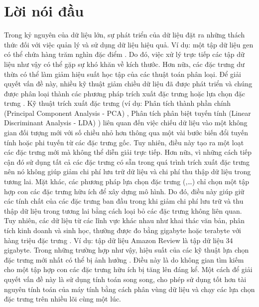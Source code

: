 \chapter*{Lời nói đầu}

Trong kỷ nguyên của dữ liệu lớn, sự phát triển của dữ liệu đặt ra những thách thức đối với việc quản lý và sử dụng dữ liệu hiệu quả. Ví dụ: một tập dữ liệu gen có thể chứa hàng trăm nghìn đặc điểm \cite{guyon2007competitive}. Do đó, việc xử lý trực tiếp các tập dữ liệu như vậy có thể gặp sự khó khăn về kích thước. Hơn nữa, các đặc trưng dư thừa có thể làm giảm hiệu suất học tập của các thuật toán phân loại. Để giải quyết vấn đề này, nhiều kỹ thuật giảm chiều dữ liệu đã được phát triển \cite{melab2006grid,de2006parallelizing,garcia2006parallel,guillen2009efficient,lopez2006solving} và chúng được phân loại thành các phương pháp trích xuất đặc trưng hoặc lựa chọn đặc trưng \cite{liu2012feature, kumar2014feature}. Kỹ thuật trích xuất đặc trưng (ví dụ: Phân tích thành phần chính (Principal Component Analysis - PCA) \cite{johnson2002applied}, Phân tích phân biệt tuyến tính (Linear Discriminant Analysis - LDA) \cite{johnson2002applied}) liên quan đến việc chiếu dữ liệu vào một không gian đối tượng mới với số chiều nhỏ hơn thông qua một vài bước biến đổi tuyến tính hoặc phi tuyến từ các đặc trưng gốc. Tuy nhiên, điều này tạo ra một loạt các đặc trưng mới mà không thể diễn giải trực tiếp. Hơn nữa, vì những cách tiếp cận đó sử dụng tất cả các đặc trưng có sẵn trong quá trình trích xuất đặc trưng nên nó không giúp giảm chi phí lưu trữ dữ liệu và chi phí thu thập dữ liệu trong tương lai. Mặt khác, các phương pháp lựa chọn đặc trưng (\cite{sinaga2021entropy, james2013introduction},\ldots) chỉ chọn một tập hợp con các đặc trưng hữu ích để xây dựng mô hình. Do đó, điều này giúp giữ các tính chất của các đặc trưng ban đầu trong khi giảm chi phí lưu trữ và thu thập dữ liệu trong tương lai bằng cách loại bỏ các đặc trưng không liên quan. Tuy nhiên, các dữ liệu từ các lĩnh vực khác nhau như khai thác văn bản, phân tích kinh doanh và sinh học, thường được đo bằng gigabyte hoặc terabyte với hàng triệu đặc trưng \cite{bolon2015feature, li2017feature}. Ví dụ: tập dữ liệu Amazon Review \cite{ni2019justifying} là tập dữ liệu 34 gigabyte. Trong những trường hợp như vậy, hiệu suất của các kỹ thuật lựa chọn đặc trưng mới nhất có thể bị ảnh hưởng  \cite{li2017feature}. Điều này là do không gian tìm kiếm cho một tập hợp con các đặc trưng hữu ích bị tăng lên đáng kể. Một cách để giải quyết vấn đề này là sử dụng tính toán song song, cho phép sử dụng tốt hơn tài nguyên tính toán của máy tính bằng cách phân vùng dữ liệu và chạy các lựa chọn đặc trưng trên nhiều lõi cùng một lúc.

